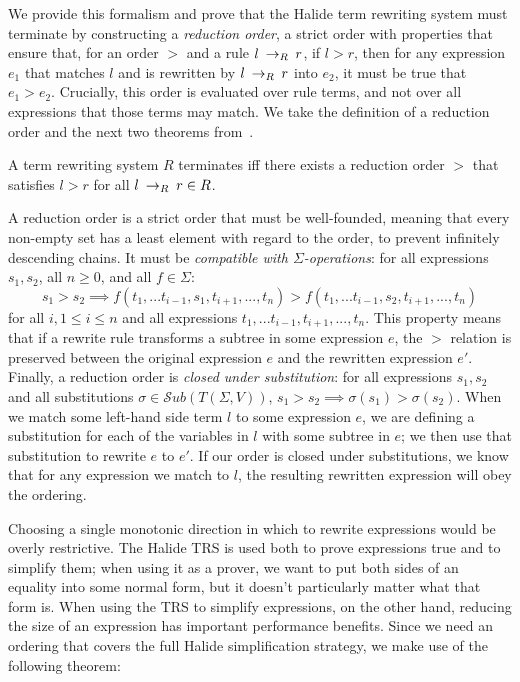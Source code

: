 We provide this formalism and prove that the Halide term rewriting system must terminate by constructing a \emph{reduction order}, a strict order with properties that ensure that, for an order $>$ and a rule $l \:\rightarrow_{R}\: r$, if $l > r$, then for any expression $e_1$ that matches $l$ and is rewritten by $l \:\rightarrow_{R}\: r$ into $e_2$, it must be true that $e_1 > e_2$. Crucially, this order is evaluated over rule terms, and not over all expressions that those terms may match. We take the definition of a reduction order and the next two theorems from~\cite{baader1999term}.

\begin{theorem}\label{theorem:terminates}
A term rewriting system $R$ terminates iff there exists a reduction order $>$ that satisfies $l > r$ for all $l \:\rightarrow_{R}\: r \in R$.
\end{theorem}

A reduction order is a strict order that must be well-founded, meaning that every non-empty set has a least element with regard to the order, to prevent infinitely descending chains. It must be \emph{compatible with $\Sigma$-operations}: for all expressions $s_1, s_2$, all $n \geq 0$, and all $f \in \Sigma$:
\[
s_1 > s_2 \implies f(t_1,...t_{i-1},s_1,t_{i+1},...,t_n) > f(t_1,...t_{i-1},s_2,t_{i+1},...,t_n)
\]
for all $i, 1 \leq i \leq n$ and all expressions $t_1,...t_{i-1},t_{i+1},...,t_n$. This property means that if a rewrite rule transforms a subtree in some expression $e$, the $>$ relation is preserved between the original expression $e$ and the rewritten expression $e'$. Finally, a reduction order is \emph{closed under substitution}: for all expressions $s_1, s_2$ and all substitutions $\sigma \in \mathcal{S}ub(T(\Sigma,V))$, 
$s_1 > s_2 \implies \sigma(s_1) > \sigma(s_2)$. When we match some left-hand side term $l$ to some expression $e$, we are defining a substitution for each of the variables in $l$ with some subtree in $e$; we then use that substitution to rewrite $e$ to $e'$. If our order is closed under substitutions, we know that for any expression we match to $l$, the resulting rewritten expression will obey the ordering.

Choosing a single monotonic direction in which to rewrite expressions would be overly restrictive. 
The Halide TRS is used both to prove expressions true and to simplify them; when using it as a prover, we want to put both sides of an equality into some normal form, but it doesn't particularly matter what that form is. When using the TRS to simplify expressions, on the other hand, reducing the size of an expression has important performance benefits. Since we need an ordering that covers the full Halide simplification strategy, we make use of the following theorem:

